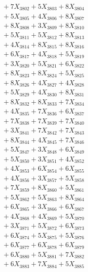 \documentclass[a4paper,10pt]{article}
\begin{document}
{\begin{align}
&\;  + 7 X_{3802} + 5 X_{3803} + 8 X_{3804} \\[0.3ex]
&\;  + 5 X_{3805} + 4 X_{3806} + 8 X_{3807} \\[0.3ex]
&\;  + 8 X_{3808} + 3 X_{3809} + 8 X_{3810} \\[0.3ex]
&\;  + 5 X_{3811} + 5 X_{3812} + 8 X_{3813} \\[0.3ex]
&\;  + 4 X_{3814} + 8 X_{3815} + 8 X_{3816} \\[0.3ex]
&\;  + 6 X_{3817} + 4 X_{3818} + 5 X_{3819} \\[0.5ex]\allowbreak
&\;  + 3 X_{3820} + 5 X_{3821} + 6 X_{3822} \\[0.3ex]
&\;  + 8 X_{3823} + 8 X_{3824} + 5 X_{3825} \\[0.3ex]
&\;  + 8 X_{3826} + 4 X_{3827} + 4 X_{3828} \\[0.3ex]
&\;  + 5 X_{3829} + 4 X_{3830} + 8 X_{3831} \\[0.3ex]
&\;  + 8 X_{3832} + 8 X_{3833} + 7 X_{3834} \\[0.3ex]
&\;  + 4 X_{3835} + 7 X_{3836} + 6 X_{3837} \\[0.3ex]
&\;  + 7 X_{3838} + 7 X_{3839} + 7 X_{3840} \\[0.3ex]
&\;  + 3 X_{3841} + 7 X_{3842} + 7 X_{3843} \\[0.3ex]
&\;  + 8 X_{3844} + 4 X_{3845} + 7 X_{3846} \\[0.3ex]
&\;  + 5 X_{3847} + 3 X_{3848} + 6 X_{3849} \\[0.5ex]\allowbreak
&\;  + 5 X_{3850} + 3 X_{3851} + 4 X_{3852} \\[0.3ex]
&\;  + 4 X_{3853} + 6 X_{3854} + 6 X_{3855} \\[0.3ex]
&\;  + 4 X_{3856} + 3 X_{3857} + 5 X_{3858} \\[0.3ex]
&\;  + 7 X_{3859} + 8 X_{3860} + 5 X_{3861} \\[0.3ex]
&\;  + 5 X_{3862} + 5 X_{3863} + 8 X_{3864} \\[0.3ex]
&\;  + 6 X_{3865} + 3 X_{3866} + 6 X_{3867} \\[0.3ex]
&\;  + 4 X_{3868} + 4 X_{3869} + 5 X_{3870} \\[0.3ex]
&\;  + 3 X_{3871} + 5 X_{3872} + 6 X_{3873} \\[0.3ex]
&\;  + 6 X_{3874} + 5 X_{3875} + 5 X_{3876} \\[0.3ex]
&\;  + 6 X_{3877} + 6 X_{3878} + 6 X_{3879} \\[0.5ex]\allowbreak
&\;  + 6 X_{3880} + 5 X_{3881} + 7 X_{3882} \\[0.3ex]
&\;  + 6 X_{3883} + 7 X_{3884} + 5 X_{3885} \\[0.3ex]

\end{align}}
\end{document}
